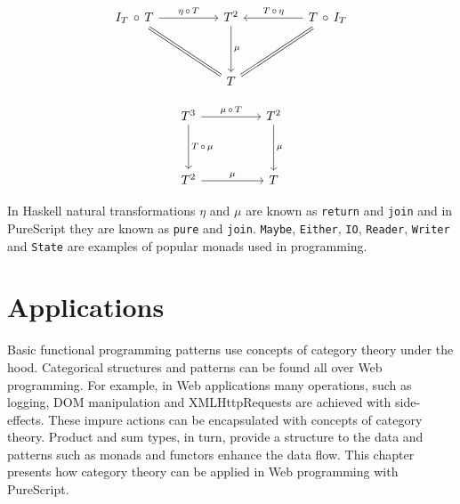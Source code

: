 \documentclass[article]{aaltoseries}
\begin{document}
    \begin{equation}
      \label{identity}
      \begin{tikzcd}[row sep=huge, column sep=huge]
        I_T\, \circ\, T
        \arrow[r, "\eta\, \circ\, T"]
        \arrow[dr, equal]
        & T^2
        \arrow[d, "\mu"]
        & T\, \circ\, I_T
        \arrow[l, "T\, \circ\, \eta"{above}]
        \arrow[dl, equal] \\
        {}
        & T
        &
      \end{tikzcd}
    \end{equation}

    \begin{equation}
      \label{associativity}
      \begin{tikzcd}[row sep=huge, column sep=huge]
        T^3 \arrow[r, "\mu\, \circ\, T"]
        \arrow[d, "T\, \circ\, \mu"]
        & T^2 \arrow[d, "\mu"] \\
        T^2 \arrow[r, "\mu"]
        & T
      \end{tikzcd}
    \end{equation}

    In Haskell natural transformations $\eta$ and $\mu$ are known as
    \lstinline|return| and \lstinline|join| and in PureScript they are known as
    \lstinline|pure| and \lstinline|join|. \lstinline|Maybe|,
    \lstinline|Either|, \lstinline|IO|, \lstinline|Reader|, \lstinline|Writer|
    and \lstinline|State| are examples of popular monads used in programming.



\section{Applications}

Basic functional programming patterns use concepts of category theory under the
hood. Categorical structures and patterns can be found all over Web
programming. For example, in Web applications many operations, such as logging,
DOM manipulation and XMLHttpRequests are achieved with side-effects. These
impure actions can be encapsulated with concepts of category theory. Product and
sum types, in turn, provide a structure to the data and patterns such as monads and
functors enhance the data flow. This chapter presents how category
theory can be applied in Web programming with PureScript.

\end{document}

